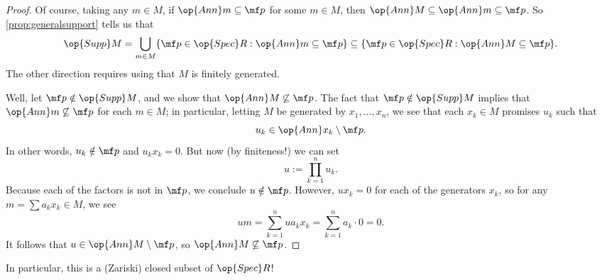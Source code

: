 \begin{proof}
	Of course, taking any $m\in M$, if $\op{Ann}m\subseteq\mf p$ for some $m\in M$, then $\op{Ann}M\subseteq\op{Ann}m\subseteq\mf p$. So \autoref{prop:generalsupport} tells us that
	\[\op{Supp}M=\bigcup_{m\in M}\{\mf p\in\op{Spec}R:\op{Ann}m\subseteq\mf p\}\subseteq\{\mf p\in\op{Spec}R:\op{Ann}M\subseteq\mf p\}.\]
	The other direction requires using that $M$ is finitely generated.

	Well, let $\mf p\notin\op{Supp}M$, and we show that $\op{Ann}M\not\subseteq\mf p$. The fact that $\mf p\notin\op{Supp}M$ implies that $\op{Ann}m\not\subseteq\mf p$ for each $m\in M$; in particular, letting $M$ be generated by $x_1,\ldots,x_n$, we see that each $x_k\in M$ promises $u_k$ such that
	\[u_k\in\op{Ann}x_k\setminus\mf p.\]
	In other words, $u_k\notin\mf p$ and $u_kx_k=0$. But now (by finiteness!) we can set
	\[u:=\prod_{k=1}^nu_k.\]
	Because each of the factors is not in $\mf p$, we conclude $u\notin\mf p$. However, $ux_k=0$ for each of the generators $x_k$, so for any $m=\sum a_kx_k\in M$, we see
	\[um=\sum_{k=1}^nua_kx_k=\sum_{k=1}^na_k\cdot0=0.\]
	It follows that $u\in\op{Ann}M\setminus\mf p$, so $\op{Ann}M\not\subseteq\mf p$.
\end{proof}
In particular, this is a (Zariski) closed subset of $\op{Spec}R$!

